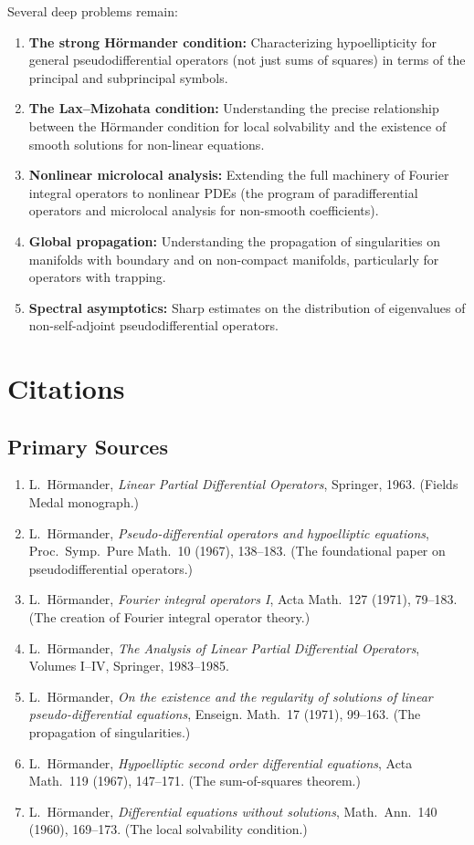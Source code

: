 Several deep problems remain:
\begin{enumerate}
    \item \textbf{The strong H\"ormander condition:} Characterizing
    hypoellipticity for general pseudodifferential operators (not just
    sums of squares) in terms of the principal and subprincipal symbols.
    \item \textbf{The Lax--Mizohata condition:} Understanding the
    precise relationship between the H\"ormander condition for local
    solvability and the existence of smooth solutions for non-linear
    equations.
    \item \textbf{Nonlinear microlocal analysis:} Extending the full
    machinery of Fourier integral operators to nonlinear PDEs (the
    program of paradifferential operators and microlocal analysis for
    non-smooth coefficients).
    \item \textbf{Global propagation:} Understanding the propagation
    of singularities on manifolds with boundary and on non-compact
    manifolds, particularly for operators with trapping.
    \item \textbf{Spectral asymptotics:} Sharp estimates on the
    distribution of eigenvalues of non-self-adjoint pseudodifferential
    operators.
\end{enumerate}

\section{Citations}\subsection*{Primary Sources}
\begin{enumerate}
    \item L.\ H\"ormander, \textit{Linear Partial Differential
    Operators}, Springer, 1963. (Fields Medal monograph.)
    \item L.\ H\"ormander, \textit{Pseudo-differential operators and
    hypoelliptic equations}, Proc.\ Symp.\ Pure Math.\ 10 (1967),
    138--183. (The foundational paper on pseudodifferential operators.)
    \item L.\ H\"ormander, \textit{Fourier integral operators I},
    Acta Math.\ 127 (1971), 79--183. (The creation of Fourier integral
    operator theory.)
    \item L.\ H\"ormander, \textit{The Analysis of Linear Partial
    Differential Operators}, Volumes I--IV, Springer, 1983--1985.
    \item L.\ H\"ormander, \textit{On the existence and the regularity
    of solutions of linear pseudo-differential equations}, Enseign.
    Math.\ 17 (1971), 99--163. (The propagation of singularities.)
    \item L.\ H\"ormander, \textit{Hypoelliptic second order
    differential equations}, Acta Math.\ 119 (1967), 147--171.
    (The sum-of-squares theorem.)
    \item L.\ H\"ormander, \textit{Differential equations without
    solutions}, Math.\ Ann.\ 140 (1960), 169--173. (The local
    solvability condition.)
\end{enumerate}

